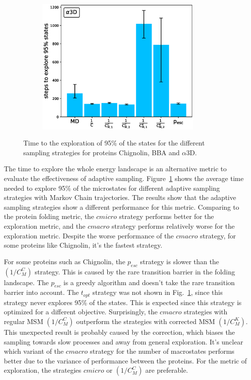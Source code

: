 \begin{figure}[H]
\begin{subfigure}[t]{0.5\textwidth}
    \includegraphics[width=0.9\textwidth]{figures/A3D_7_steps10000_nparallel100_explore.eps}   
  \end{subfigure}
  \caption{Time to the exploration of 95\% of the states for the different sampling strategies for proteins Chignolin, BBA and $\alpha$3D.}
  \label{fig:Time_explore}
\end{figure}

The time to explore the whole energy landscape is an alternative metric to evaluate the effectiveness of adaptive sampling. Figure~\ref{fig:Time_explore} shows the average time needed to explore 95\% of the microstates for different adaptive sampling strategies with Markov Chain trajectories.
The results show that the adaptive sampling strategies show a different performance for this metric. Comparing to the protein folding metric, the $cmicro$ strategy performs better for the exploration metric, and the $cmacro$ strategy performs relatively worse for the exploration metric. Despite the worse performance of the $cmacro$ strategy, for some proteins like Chignolin, it's the fastest strategy. 


For some proteins such as Chignolin, the $p_{esc}$ strategy is slower than the $(1/C_M^C)$ strategy. This is caused by the rare transition barrier in the folding landscape. The $p_{esc}$ is a greedy algorithm and doesn't take the rare transition barrier into account. The $t_{opt}$ strategy was not shown in Fig.~\ref{fig:Time_explore}, since this strategy never explores 95\% of the states. This is expected since this strategy is optimized for a different objective.
Surprisingly, the $cmacro$ strategies with regular MSM $(1/C_M^C)$ outperform
the strategies with corrected MSM $(1/C_M^K)$. This unexpected result is probably caused by the correction, which biases the sampling towards slow processes and away from general exploration. It's unclear which variant of the $cmacro$ strategy for the number of macrostates performs better due to the variance of performance between the proteins. For the metric of exploration, the strategies $cmicro$ or  $(1/C_M^C)$ are preferable. 

